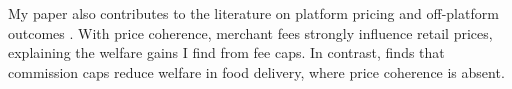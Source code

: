 \documentclass[main.tex]{subfiles}
\begin{document}
My paper also contributes to the literature on platform pricing and off-platform outcomes \parencite{Bergemann.etal2024, Chen2024}.
With price coherence, merchant fees strongly influence retail prices, explaining the welfare gains I find from fee caps.
In contrast, \textcite{Sullivan2025} finds that commission caps reduce welfare in food delivery, where price coherence is absent.
\end{document}
